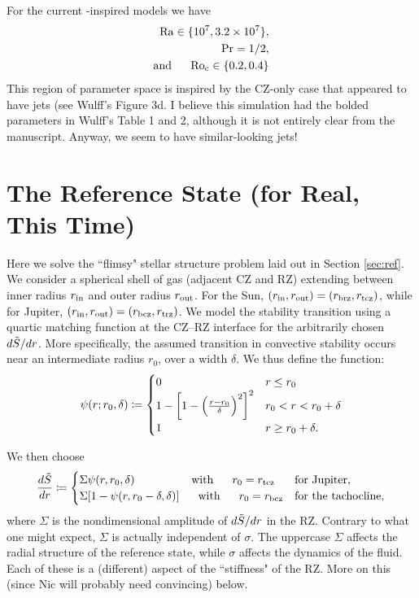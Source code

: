 \documentclass[12pt]{article}
\numberwithin{equation}{section}
\begin{document}
For the current \citealt{Wulff2022}-inspired models we have
\begin{subequations}
	\begin{align}
		{\rm{Ra}}\in\{10^7,3.2\times10^{7}\},\\
		{\rm{Pr}} = 1/2,\\
		\text{and}\ \ \ \ \  {\rm{Ro_c}} \in \{0.2, 0.4\}\\
	\end{align}
\end{subequations}
This region of parameter space is inspired by the CZ-only case that appeared to have jets (see Wulff's Figure 3d. I believe this simulation had the bolded parameters in Wulff's Table 1 and 2, although it is not entirely clear from the manuscript. Anyway, we seem to have similar-looking jets!

\section{The Reference State (for Real, This Time)}\label{sec:ref2}
Here we solve the ``flimsy" stellar structure problem laid out in Section \ref{sec:ref}. We consider a spherical shell of gas (adjacent CZ and RZ) extending between inner radius $r_{\rm{in}}$ and outer radius $r_{\rm{out}}$. For the Sun, $(r_{\rm{in}},r_{\rm{out}})=(r_{\rm brz},r_{\rm tcz})$, while for Jupiter, $(r_{\rm{in}},r_{\rm{out}})=(r_{\rm bcz},r_{\rm trz})$. We model the stability transition using a quartic matching function at the CZ--RZ interface for the arbitrarily chosen $d\tilde{S}/dr$. More specifically, the assumed transition in convective stability occurs near an intermediate radius $r_0$, over a width $\delta$. We thus define the function:
\begin{equation}
  \psi(r;r_0, \delta)\coloneqq \begin{cases}
		0 & r\leq r_0 \\
		1 - \left[1 - \Big{(}\frac{r-r_0}{\delta}\Big{)}^2\right]^2 & r_0  < r < r_0+ \delta\\
		1 & r\geq r_0+\delta.
	\end{cases}
	\label{eq:psi}
\end{equation}

We then choose 
\begin{align}\label{eq:dsdr}
	\frac{d\tilde{S}}{dr}\coloneqq \begin{cases}
		\Sigma\psi(r,r_0,\delta)\ \ \ \ \ \ \ \ \ \ \ \ \ \ \ \text{with}\ \ \ \ \  r_0=r_{\rm tcz}&\text{for Jupiter},\\
		\Sigma[1-\psi(r,r_0-\delta,\delta)]\ \ \ \ \ \text{with}\ \ \ \ \  r_0=r_{\rm bcz} &\text{for the tachocline},
	\end{cases}
\end{align}
where $\Sigma$ is the nondimensional amplitude of $d\tilde{S}/dr$ in the RZ. Contrary to what one might expect, $\Sigma$ is actually independent of $\sigma$. The uppercase $\Sigma$ affects the radial structure of the reference state, while $\sigma$ affects the dynamics of the fluid. Each of these is a (different) aspect of the ``stiffness" of the RZ. More on this (since Nic will probably need convincing) below. 
\end{document}
